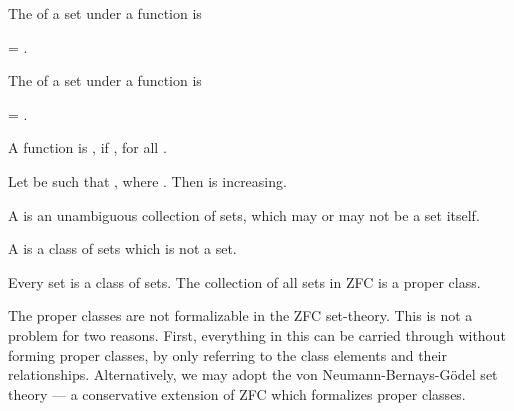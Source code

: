 \documentclass[b5paper, english, oneside]{memoir}
\begin{document}
\begin{definition}
The  of a set  under a function  is
\begin{eqs}
 = .
\end{eqs}
\end{definition}

\begin{definition}
The  of a set  under a function  is
\begin{eqs}
 = .
\end{eqs}
\end{definition}

\begin{definition}
A function  is , if , for all . 
\end{definition}

\begin{example}
Let  be such that , where . Then  is increasing.
\end{example}

\begin{definition}
A  is an unambiguous collection of sets, which may or may not be a set itself. 
\end{definition}

\begin{definition}
A  is a class of sets which is not a set. 
\end{definition}

\begin{example}
Every set is a class of sets. The collection of all sets in ZFC is a proper class.
\end{example}

\begin{note}
The proper classes are not formalizable in the ZFC set-theory. This is not a problem for two reasons. First, everything in this \manuscript{} can be carried through without forming proper classes, by only referring to the class elements and their relationships. Alternatively, we may adopt the von Neumann-Bernays-G\"odel set theory \cite{IntroToMathematicalLogic} --- a conservative extension of ZFC which formalizes proper classes.
\end{note}
\end{document}
